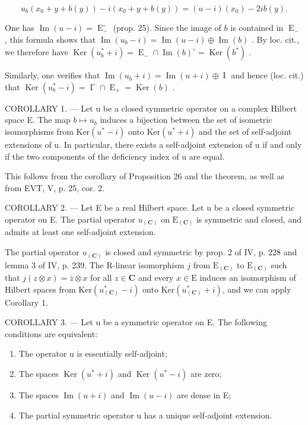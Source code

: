 \[
u _ {b} (x _ {0} + y + b (y)) - i (x _ {0} + y + b (y)) = (u - i) (x _ {0}) - 2 i b (y).
\]

One has \(\operatorname{Im}(u - i) = \operatorname{E}_{-}^{\circ}\) (prop. 25). Since the image of \(b\) is contained in \(\operatorname{E}_{-}\) , this formula shows that \(\operatorname{Im}(u_b - i) = \operatorname{Im}(u - i) \oplus \operatorname{Im}(b)\) . By loc. cit., we therefore have \(\operatorname{Ker}(u_b^* + i) = \operatorname{E}_{-} \cap \operatorname{Im}(b)^{\circ} = \operatorname{Ker}(b^*)\) .

Similarly, one verifies that \(\operatorname{Im}(u_b + i) = \operatorname{Im}(u + i) \oplus \operatorname{I}\) and hence (loc. cit.) that \(\operatorname{Ker}(u_b^* - i) = \operatorname{I}^\circ \cap \operatorname{E}_+ = \operatorname{Ker}(b)\) .

COROLLARY 1. --- Let u be a closed symmetric operator on a complex Hilbert space E. The map \(b \mapsto u_b\) induces a bijection between the set of isometric isomorphisms from \(\text{Ker}(u^* - i)\) onto \(\text{Ker}(u^* + i)\) and the set of self-adjoint extensions of u. In particular, there exists a self-adjoint extension of u if and only if the two components of the deficiency index of u are equal.

This follows from the corollary of Proposition 26 and the theorem, as well as from EVT, V, p. 25, cor. 2.

COROLLARY 2. --- Let E be a real Hilbert space. Let u be a closed symmetric operator on E. The partial operator \(u_{(\mathbf{C})}\) on \(\mathrm{E}_{(\mathbf{C})}\) is symmetric and closed, and admits at least one self-adjoint extension.

The partial operator \(u_{(\mathbf{C})}\) is closed and symmetric by prop. 2 of IV, p. 228 and lemma 3 of IV, p. 239. The R-linear isomorphism \(j\) from \(\mathrm{E}_{(\mathbf{C})}\) to \(\mathrm{E}_{(\mathbf{C})}\) such that \(j(z \otimes x) = \overline{z} \otimes x\) for all \(z \in \mathbf{C}\) and every \(x \in \mathrm{E}\) induces an isomorphism of Hilbert spaces from \(\mathrm{Ker}(u_{(\mathbf{C})}^* - i)\) onto \(\mathrm{Ker}(u_{(\mathbf{C})}^* + i)\), and we can apply Corollary 1.

COROLLARY 3. --- Let u be a symmetric operator on E. The following conditions are equivalent:

\begin{enumerate}
\def\labelenumi{(\roman{enumi})}
\item
  The operator u is essentially self-adjoint;
\item
  The spaces \(\operatorname{Ker}(u^{*} + i)\) and \(\operatorname{Ker}(u^{*} - i)\) are zero;
\item
  The spaces \(\operatorname{Im}(u + i)\) and \(\operatorname{Im}(u - i)\) are dense in E;
\item
  The partial symmetric operator u has a unique self-adjoint extension.
\end{enumerate}


